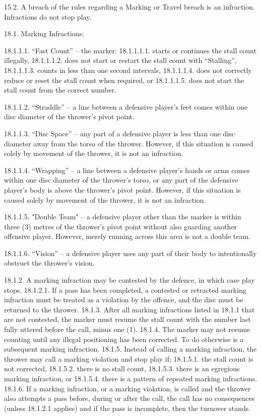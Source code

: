 15.2. A breach of the rules regarding a Marking or Travel breach is an infraction. Infractions do not stop play.

18.1. Marking Infractions:

18.1.1.1. “Fast Count” – the marker:
18.1.1.1.1. starts or continues the stall count illegally,
18.1.1.1.2. does not start or restart the stall count with “Stalling”,
18.1.1.1.3. counts in less than one second intervals,
18.1.1.1.4. does not correctly reduce or reset the stall count when required, or
18.1.1.1.5. does not start the stall count from the correct number.

18.1.1.2. “Straddle” – a line between a defensive player’s feet comes within one disc diameter of
the thrower’s pivot point.

18.1.1.3. “Disc Space” – any part of a defensive player is less than one disc diameter away from the
torso of the thrower. However, if this situation is caused solely by movement of the
thrower, it is not an infraction.

18.1.1.4. “Wrapping” – a line between a defensive player’s hands or arms comes within one disc
diameter of the thrower’s torso, or any part of the defensive player’s body is above the
thrower’s pivot point. However, if this situation is caused solely by movement of the
thrower, it is not an infraction.

18.1.1.5. "Double Team" – a defensive player other than the marker is within three (3) metres of
the thrower's pivot point without also guarding another offensive player. However,
merely running across this area is not a double team.

18.1.1.6. “Vision” – a defensive player uses any part of their body to intentionally obstruct the
thrower’s vision.

18.1.2. A marking infraction may be contested by the defence, in which case play stops.
18.1.2.1. If a pass has been completed, a contested or retracted marking infraction must be treated
as a violation by the offence, and the disc must be returned to the thrower.
18.1.3. After all marking infractions listed in 18.1.1 that are not contested, the marker must resume the
stall count with the number last fully uttered before the call, minus one (1).
18.1.4. The marker may not resume counting until any illegal positioning has been corrected. To do
otherwise is a subsequent marking infraction.
18.1.5. Instead of calling a marking infraction, the thrower may call a marking violation and stop play if;
18.1.5.1. the stall count is not corrected,
18.1.5.2. there is no stall count,
18.1.5.3. there is an egregious marking infraction, or
18.1.5.4. there is a pattern of repeated marking infractions.
18.1.6. If a marking infraction, or a marking violation, is called and the thrower also attempts a pass
before, during or after the call, the call has no consequences (unless 18.1.2.1 applies) and if the
pass is incomplete, then the turnover stands.



